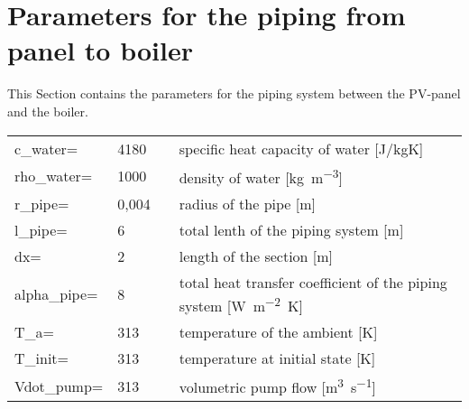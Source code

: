 \section{Parameters for the piping from panel to boiler}

This Section contains the parameters for the piping system between the PV-panel and the boiler.\\

\begin{tabular}{ l l |c| l}
	c_water=		&4180	&\cite{lim2017diurnal}	&specific heat capacity of water [J/kgK]\\     	
	rho_water=	&1000	&\cite{lim2017diurnal}	&density of water [\si[per-mode=fraction]{\kilogram\per\meter^{3}}]\\   
	r_pipe=		&0,004	&\cite{lim2017diurnal}	&radius of the pipe [\si{\meter}]\\
	l_pipe=	&6	&\cite{lim2017diurnal}	&total lenth of the piping system [\si[per-mode=fraction]{\meter}]\\ 
	dx=	&2	&\cite{lim2017diurnal}	&length of the section [\si[per-mode=fraction]{\meter}]\\   
	alpha_pipe=	&8	&\cite{lim2017diurnal}	&total heat transfer coefficient of the piping system [\si[per-mode=fraction]{\watt\per\meter^{2}\kelvin}]\\   
	T_a=	&313	&\cite{lim2017diurnal}	&temperature of the ambient [\si[per-mode=fraction]{\kelvin}]\\   
	T_init=	&313	&\cite{lim2017diurnal}	&temperature at initial state [\si[per-mode=fraction]{\kelvin}]\\  
	Vdot_pump=	&313	&\cite{lim2017diurnal}	&volumetric pump flow [\si[per-mode=fraction]{\meter^{3}\per\second}]\\  
\end{tabular} 
